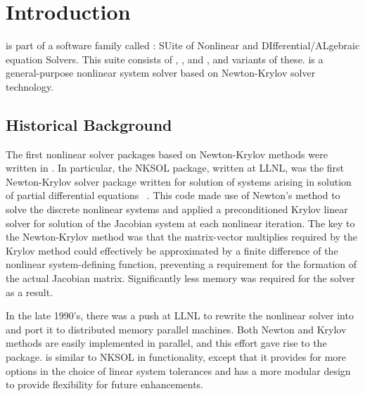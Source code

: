 \chapter{Introduction}\label{s:intro}

{\kinsol} is part of a software family called {\sundials}: SUite
of Nonlinear and DIfferential/ALgebraic equation Solvers. This
suite consists of {\cvode}, {\kinsol}, and {\ida}, and variants of
these.
%
{\kinsol} is a
general-purpose nonlinear system solver based on Newton-Krylov
solver technology.

\section{Historical Background}\label{ss:history}

  The first
nonlinear solver packages based on Newton-Krylov methods were
written in {\F}.  In particular, the NKSOL package, written at
LLNL, was the first Newton-Krylov solver package written for
solution of systems arising in solution of partial differential
equations ~\cite{BrSa:90}.  This {\F} code made use of Newton's
method to solve the discrete nonlinear systems and applied a
preconditioned Krylov linear solver for solution of the Jacobian
system at each nonlinear iteration.  The key to the Newton-Krylov
method was that the matrix-vector multiplies required by the
Krylov method could effectively be approximated by a finite
difference of the nonlinear system-defining function, preventing a
requirement for the formation of the actual Jacobian matrix.
Significantly less memory was required for the solver as a result.

In the late 1990's, there was a push at LLNL to rewrite the
nonlinear solver into {\C} and port it to distributed memory
parallel machines.  Both Newton and Krylov methods are easily
implemented in parallel, and this effort gave rise to the
{\kinsol} package. {\kinsol} is similar to NKSOL in functionality,
except that it provides for more options in the choice of linear
system tolerances and has a more modular design to provide
flexibility for future enhancements.

